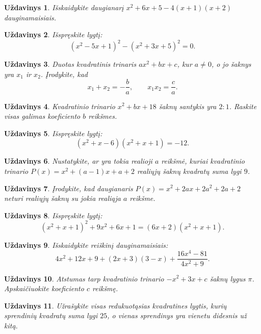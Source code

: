 \documentclass[11pt,a4paper]{scrartcl}
\newtheorem{problem}{Uždavinys}
\begin{document}
\begin{problem}
Išskaidykite daugianarį $x^2+6x+5-4(x+1)(x+2)$ dauginamaisiais.
\end{problem}

\begin{problem}
Išspręskite lygtį:
$$ (x^2-5x+1)^2-(x^2+3x+5)^2=0. $$
\end{problem}

\begin{problem}
Duotas kvadratinis trinaris $ax^2+bx+c$, kur $a\ne0$,
o jo šaknys yra $x_1$ ir $x_2$. Įrodykite, kad
$$ x_1+x_2=-\frac{b}{a},\qquad x_1x_2=\frac{c}{a}. $$
\end{problem}

\begin{problem}
Kvadratinio trinario $x^2+bx+18$ šaknų santykis yra $2:1$.
Raskite visas galimas koeficiento $b$ reikšmes.
\end{problem}

\begin{problem}
Išspręskite lygtį:
$$ (x^2+x-6)(x^2+x+1)=-12. $$
\end{problem}

\begin{problem}
Nustatykite, ar yra tokia realioji $a$ reikšmė, kuriai
kvadratinio trinario $P(x)=x^2+(a-1)x+a+2$ realiųjų šaknų
kvadratų suma lygi $9$.
\end{problem}

\begin{problem}
Įrodykite, kad daugianaris $P(x)=x^2+2ax+2a^2+2a+2$
neturi realiųjų šaknų su jokia realiąja $a$ reikšme.
\end{problem}

\begin{problem}
Išspręskite lygtį:
$$ (x^2+x+1)^2+9x^2+6x+1=(6x+2)(x^2+x+1). $$
\end{problem}

\begin{problem}
Išskaidykite reiškinį dauginamaisiais:
$$ 4x^2+12x+9+(2x+3)(3-x)+\frac{16x^4-81}{4x^2+9}. $$
\end{problem}

\begin{problem}
Atstumas tarp kvadratinio trinario $-x^2+3x+c$ šaknų lygus $\pi$.
Apskaičiuokite koeficiento $c$ reikšmę.
\end{problem}

\begin{problem}
Užrašykite visas redukuotąsias kvadratines lygtis, kurių sprendinių
kvadratų suma lygi $25$, o vienas sprendinys yra vienetu didesnis už kitą.
\end{problem}
\end{document}
